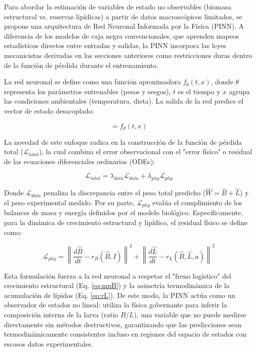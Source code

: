 Para abordar la estimación de variables de estado no observables (biomasa estructural vs. reservas lipídicas) 
a partir de datos macroscópicos limitados, se propone una arquitectura de Red Neuronal Informada por la 
Física (PINN). A diferencia de los modelos de caja negra convencionales, que aprenden mapeos estadísticos 
directos entre entradas y salidas, la PINN incorpora las leyes mecanicistas derivadas en las secciones 
anteriores como restricciones duras dentro de la función de pérdida durante el entrenamiento.

La red neuronal se define como una función aproximadora $f_{\theta}(t, x)$, donde $\theta$ representa 
los parámetros entrenables (pesos y sesgos), $t$ es el tiempo y $x$ agrupa las condiciones ambientales 
(temperatura, dieta). La salida de la red predice el vector de estado desacoplado:

\begin{equation}
[\hat{B}, \hat{L}] = f_{\theta}(t, x)
\end{equation}

La novedad de este enfoque radica en la construcción de la función de pérdida total ($\mathcal{L}_{total}$), 
la cual combina el error observacional con el "error físico" o residual de las ecuaciones diferenciales ordinarias (ODEs):

\begin{equation}
\mathcal{L}_{total} = \lambda_{data}\mathcal{L}_{data} + \lambda_{phy}\mathcal{L}_{phy}
\end{equation}

Donde $\mathcal{L}_{data}$ penaliza la discrepancia entre el peso total predicho ($\hat{W} = \hat{B} + \hat{L}$) 
y el peso experimental medido. Por su parte, $\mathcal{L}_{phy}$ evalúa el cumplimiento de los balances 
de masa y energía definidos por el modelo biológico. Específicamente, para la dinámica de crecimiento 
estructural y lipídico, el residual físico se define como:

\begin{equation}
\mathcal{L}_{phy} = \left\| \frac{d\hat{B}}{dt} - r_B(\hat{B}, I) \right\|^2 + 
\left\| \frac{d\hat{L}}{dt} - r_L(\hat{B}, \hat{L}, a) \right\|^2
\end{equation}

Esta formulación fuerza a la red neuronal a respetar el "freno logístico" del crecimiento estructural 
(Eq. \ref{eq:muB}) y la asimetría termodinámica de la acumulación de lípidos (Eq. \ref{eq:rL}). 
De este modo, la PINN actúa como un observador de estados no lineal: utiliza la física gobernante 
para inferir la composición interna de la larva (ratio $B/L$), una variable que no puede medirse 
directamente sin métodos destructivos, garantizando que las predicciones sean termodinámicamente 
consistentes incluso en regiones del espacio de estados con escasos datos experimentales.

